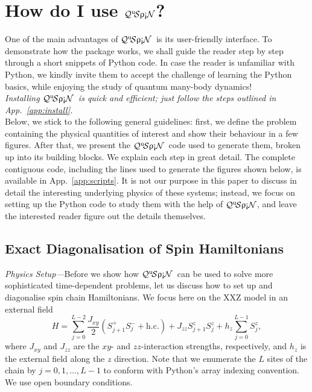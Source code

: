 \documentclass{SciPost}
\newcommand\0{\scalebox{-1}[1]{0}}
\newcommand{\qspin}{$\mathcal{Q}^{\mathrm{u}}\!\mathcal{S}\uprho\mathrm{\text{\textexclamdown}}\mathcal{N}$}
\begin{document}
\section{How do I use \qspin?}
\label{sec:examples}

One of the main advantages of \qspin\ is its user-friendly interface. To demonstrate how the package works, we shall guide the reader step by step through a short snippets of Python code. In case the reader is unfamiliar with Python, we kindly invite them to accept the challenge of learning the Python basics, while enjoying the study of quantum many-body dynamics! \\

\emph{Installing \qspin\ is quick and efficient; just follow the steps outlined in App.~\ref{app:install}.}\\

\noindent Below, we stick to the following general guidelines: first, we define the problem containing the physical quantities of interest and show their behaviour in a few figures. After that, we present the \qspin\ code used to generate them, broken up into its building blocks. We explain each step in great detail. The complete contiguous code, including the lines used to generate the figures shown below, is available in App.~\ref{app:scripts}. It is not our purpose in this paper to discuss in detail the interesting underlying physics of these systems; instead, we focus on setting up the Python code to study them with the help of \qspin, and leave the interested reader figure out the details themselves.

\subsection{Exact Diagonalisation of Spin Hamiltonians}
\label{subsec:ED}



\emph{Physics Setup---}Before we show how \qspin\ can be used to solve more sophisticated time-dependent problems, let us discuss how to set up and diagonalise spin chain Hamiltonians. We focus here on the XXZ model in an external field
\begin{equation}
H = \sum_{j=0}^{L-2}\frac{J_{xy}}{2}\left(S^+_{j+1}S^-_{j} + \mathrm{h.c.}\right) + J_{zz}S^z_{j+1}S^z_{j} + h_z\sum_{j=0}^{L-1}S^z_{j},
\label{eq:XXZ_ED}
\end{equation} 
where $J_{xy}$ and $J_{zz}$ are the $xy$- and $zz$-interaction strengths, respectively, and $h_z$ is the external field along the $z$ direction. Note that we enumerate the $L$ sites of the chain by $j = 0,1,\dots, L-1$ to conform with Python's array indexing convention. We use open boundary conditions.
\end{document}
